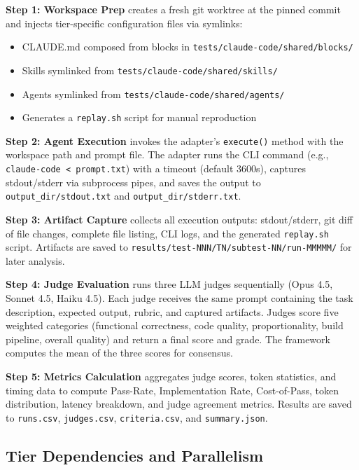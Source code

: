 \documentclass[11pt]{article}
\begin{document}
\textbf{Step 1: Workspace Prep} creates a fresh git worktree at the pinned commit and injects tier-specific configuration files via symlinks:

\begin{itemize}
\item CLAUDE.md composed from blocks in \texttt{tests/claude-code/shared/blocks/}
\item Skills symlinked from \texttt{tests/claude-code/shared/skills/}
\item Agents symlinked from \texttt{tests/claude-code/shared/agents/}
\item Generates a \texttt{replay.sh} script for manual reproduction
\end{itemize}

\textbf{Step 2: Agent Execution} invokes the adapter's \texttt{execute()} method with the workspace path and prompt file. The adapter runs the CLI command (e.g., \texttt{claude-code < prompt.txt}) with a timeout (default 3600s), captures stdout/stderr via subprocess pipes, and saves the output to \texttt{output\_dir/stdout.txt} and \texttt{output\_dir/stderr.txt}.

\textbf{Step 3: Artifact Capture} collects all execution outputs: stdout/stderr, git diff of file changes, complete file listing, CLI logs, and the generated \texttt{replay.sh} script. Artifacts are saved to \texttt{results/test-NNN/TN/subtest-NN/run-MMMMM/} for later analysis.

\textbf{Step 4: Judge Evaluation} runs three LLM judges sequentially (Opus 4.5, Sonnet 4.5, Haiku 4.5). Each judge receives the same prompt containing the task description, expected output, rubric, and captured artifacts. Judges score five weighted categories (functional correctness, code quality, proportionality, build pipeline, overall quality) and return a final score and grade. The framework computes the mean of the three scores for consensus.

\textbf{Step 5: Metrics Calculation} aggregates judge scores, token statistics, and timing data to compute Pass-Rate, Implementation Rate, Cost-of-Pass, token distribution, latency breakdown, and judge agreement metrics. Results are saved to \texttt{runs.csv}, \texttt{judges.csv}, \texttt{criteria.csv}, and \texttt{summary.json}.

\subsection{Tier Dependencies and Parallelism}\label{sec:tier-deps}
\end{document}
